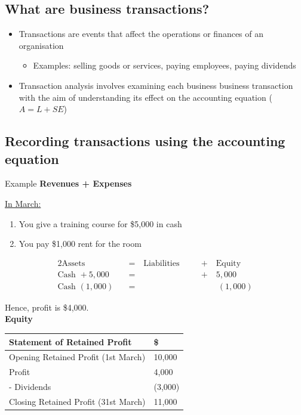 \documentclass{article}
\begin{document}
	\subsection{What are business transactions?}

		\begin{itemize}
			\item Transactions are events that affect the operations or finances of an organisation
				\begin{itemize}
					\item Examples: selling goods or services, paying employees, paying dividends
				\end{itemize}
			\item Transaction analysis involves examining each business business transaction with the aim of understanding its effect on the accounting equation ($A = L + SE$)
		\end{itemize}

	\subsection{Recording transactions using the accounting equation}

		\begin{question}{Example}
			\textbf{Revenues + Expenses}

				\underline{In March:}
				\begin{enumerate}
					\item You give a training course for \$5,000 in cash
					\item You pay \$1,000 rent for the room
				\end{enumerate}
				\begin{alignat*}{2}
					\text{Assets} \quad &= \quad \text{Liabilities} \quad &&+ \quad \text{Equity}	\\
					\text{Cash } + 5,000 \quad &= &&+ \quad 5,000	\\
					\text{Cash } (1,000) \quad &= && \qquad (1,000)
				\end{alignat*}

				Hence, profit is \$4,000.
				\\

			\textbf{Equity} 

				\begin{table}[H]
					\begin{center}
						\begin{tabular}[c]{p{8cm}|p{3cm}}
							\hline
							Statement of Retained Profit				& \$		\\
							\hline
							Opening Retained Profit (1st March)			& 10,000	\\
							\qquad Profit 								& 4,000		\\
							\qquad - Dividends							& (3,000)	\\
							Closing Retained Profit (31st March)		& 11,000	\\
							\hline
						\end{tabular}
					\end{center}
				\end{table}
			
		\end{question}
\end{document}
